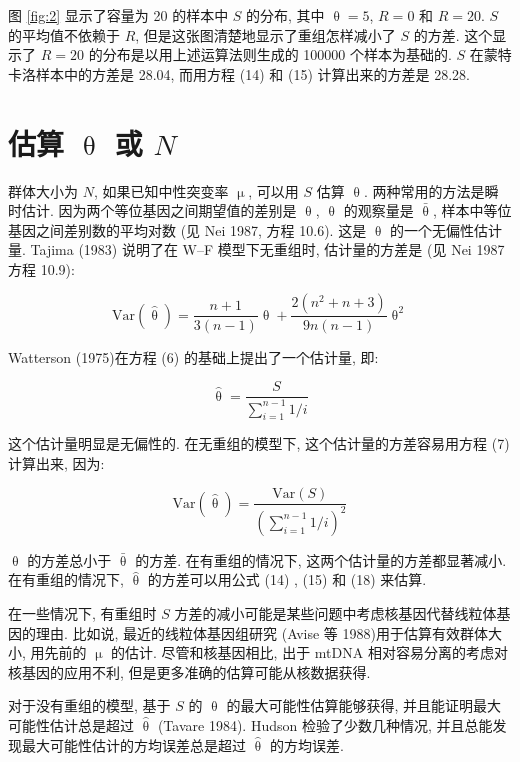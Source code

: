 \documentclass[12pt]{article}
\begin{document}
图 \ref{fig:2} 显示了容量为 20 的样本中 $S$ 的分布, 其中 $\uptheta =5$, $R=0$ 和 $R=20$. $S$ 的平均值不依赖于
$R$, 但是这张图清楚地显示了重组怎样减小了 $S$ 的方差. 这个显示了 $R=20$ 的分布是以用上述运算法则生成的 100000
个样本为基础的. $S$ 在蒙特卡洛样本中的方差是 28.04, 而用方程 (14) 和 (15) 计算出来的方差是 28.28.

\section{估算 $\uptheta$ 或 $N$}

群体大小为 $N$, 如果已知中性突变率 $\upmu$, 可以用 $S$ 估算 $\uptheta$. 两种常用的方法是瞬时估计.
因为两个等位基因之间期望值的差别是 $\uptheta$, $\uptheta$ 的观察量是 $\overset{‾}{\uptheta}$,
样本中等位基因之间差别数的平均对数 (见 Nei 1987, 方程 10.6). 这是 $\uptheta$ 的一个无偏性估计量. Tajima (1983) 说明了在
W--F 模型下无重组时, 估计量的方差是 (见 Nei 1987 方程 10.9):

\begin{equation} \label{eq:16}
    \text{Var}(\hat{\uptheta})=\frac{n+1}{3(n-1)}\uptheta + \frac{2(n^{2}+n+3)}{9n(n-1)}\uptheta^{2}
\end{equation}

Watterson (1975)在方程 (6) 的基础上提出了一个估计量, 即:

\begin{equation} \label{eq:17}
    \hat{\uptheta}=\frac{S}{\sum_{i=1}^{n-1}1/i}
\end{equation}

这个估计量明显是无偏性的. 在无重组的模型下, 这个估计量的方差容易用方程 (7) 计算出来, 因为:

\begin{equation} \label{eq:18}
    \text{Var}(\hat{\uptheta})=\frac{\text{Var}(S)}{\left( \sum_{i=1}^{n-1} 1/i \right)^{2}}
\end{equation}

$\uptheta$ 的方差总小于 $\overset{‾}{\uptheta}$ 的方差. 在有重组的情况下, 这两个估计量的方差都显著减小.
在有重组的情况下, $\hat{\uptheta}$ 的方差可以用公式 (14) , (15) 和 (18) 来估算.

在一些情况下, 有重组时 $S$ 方差的减小可能是某些问题中考虑核基因代替线粒体基因的理由. 比如说, 最近的线粒体基因组研究
(Avise 等 1988)用于估算有效群体大小, 用先前的 $\upmu$ 的估计. 尽管和核基因相比, 出于 mtDNA
相对容易分离的考虑对核基因的应用不利, 但是更多准确的估算可能从核数据获得.

对于没有重组的模型, 基于 $S$ 的 $\uptheta$ 的最大可能性估算能够获得, 并且能证明最大可能性估计总是超过 $\hat{\uptheta}$
(Tavare 1984). Hudson 检验了少数几种情况, 并且总能发现最大可能性估计的方均误差总是超过 $\hat{\uptheta}$ 的方均误差.
\end{document}
